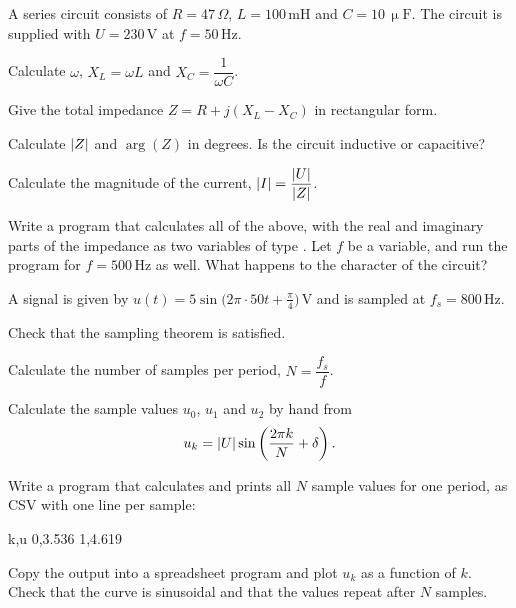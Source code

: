 A series circuit consists of $R = 47\,\Omega$, $L = 100\,\text{mH}$ and $C = 10\,\upmu\text{F}$.
The circuit is supplied with $U = 230\,\text{V}$ at $f = 50\,\text{Hz}$.
\begin{parts}
  \item Calculate $\omega$, $X_L = \omega L$ and $X_C = \dfrac{1}{\omega C}$.
  \item Give the total impedance $Z = R + j(X_L - X_C)$ in rectangular form.
  \item Calculate $\lvert Z\rvert$ and $\arg(Z)$ in degrees. Is the circuit inductive or capacitive?
  \item Calculate the magnitude of the current, $\lvert I\rvert = \dfrac{\lvert U\rvert}{\lvert Z\rvert}$.
  \item Write a program that calculates all of the above, with the real and imaginary parts of the
    impedance as two variables of type . Let $f$ be a variable, and run the program for $f = 500\,\text{Hz}$ as well. What happens to the character
    of the circuit?
\end{parts}


A signal is given by $u(t) = 5\sin\bigl(2\pi \cdot 50t + \frac{\pi}{4}\bigr)\,\text{V}$ and is
sampled at $f_s = 800\,\text{Hz}$.
\begin{parts}
  \item Check that the sampling theorem is satisfied.
  \item Calculate the number of samples per period, $N = \dfrac{f_s}{f}$.
  \item Calculate the sample values $u_0$, $u_1$ and $u_2$ by hand from
    \[
      u_k = \lvert U\rvert \sin\left(\frac{2\pi k}{N} + \delta\right).
    \]
  \item Write a program that calculates and prints all $N$ sample values for one period, as CSV
    with one line per sample:
\begin{console}
k,u
0,3.536
1,4.619
\end{console}
  \item Copy the output into a spreadsheet program and plot $u_k$ as a function of $k$. Check
    that the curve is sinusoidal and that the values repeat after $N$ samples.
\end{parts}

